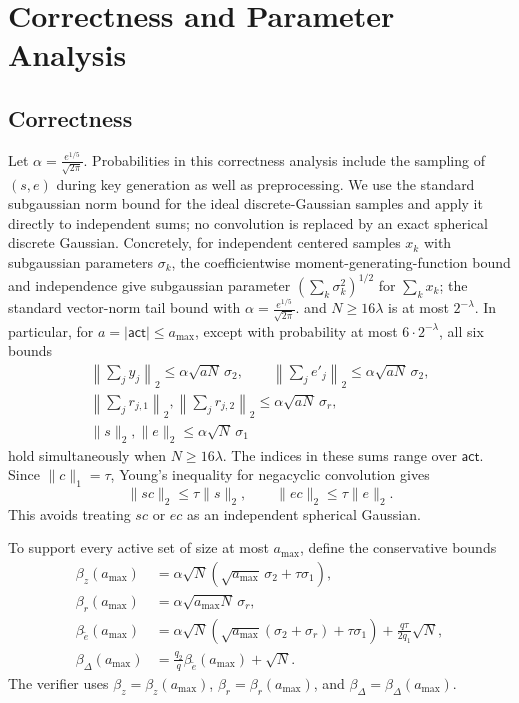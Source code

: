 \documentclass[lettersize,journal]{IEEEtran}
\begin{document}
	\section{Correctness and Parameter Analysis}
	\subsection{Correctness}
	\label{app:correctness-details}
	Let $
	\alpha=\frac{e^{1/5}}{\sqrt{2\pi}}.$
	Probabilities in this correctness analysis include the
	sampling of $(s,e)$ during key generation as well as preprocessing.
	We use the standard subgaussian norm bound for the ideal discrete-Gaussian
	samples and apply it directly to independent sums; no convolution is replaced
	by an exact spherical discrete Gaussian. {Concretely, for
		independent centered samples $x_k$ with subgaussian parameters $\sigma_k$, the
		coefficientwise moment-generating-function bound and independence give
		subgaussian parameter $(\sum_k\sigma_k^2)^{1/2}$ for $\sum_kx_k$; the standard
		vector-norm tail bound with
		$\alpha=\frac{e^{1/5}}{\sqrt{2\pi}}.$ and $N\geq16\lambda$ is at most
		$2^{-\lambda}$.} In particular, for
	$a=|\mathsf{act}|\leq a_{\max}$, except with probability at most
	$6\cdot2^{-\lambda}$, all six bounds
	\[
	\begin{gathered}
		\left\|\sum_jy_j\right\|_2
		\leq\alpha\sqrt{aN}\,\sigma_2,
		\qquad
		\left\|\sum_je'_j\right\|_2
		\leq\alpha\sqrt{aN}\,\sigma_2,\\
		\left\|\sum_jr_{j,1}\right\|_2,
		\left\|\sum_jr_{j,2}\right\|_2
		\leq\alpha\sqrt{aN}\,\sigma_r,\\
		\|s\|_2,\|e\|_2
		\leq\alpha\sqrt N\,\sigma_1
	\end{gathered}
	\]
	hold simultaneously when $N\geq16\lambda$. The indices in these sums range over
	$\mathsf{act}$. Since $\|c\|_1=\tau$, Young's inequality for negacyclic
	convolution gives
	\[
	\|sc\|_2\leq\tau\|s\|_2,
	\qquad
	\|ec\|_2\leq\tau\|e\|_2.
	\]
	This avoids treating $sc$ or $ec$ as an independent spherical Gaussian.
	
	To support every active set of size at most $a_{\max}$, define the conservative
	bounds
	\[
	\begin{aligned}
		\beta_z(a_{\max})
		&=
		\alpha\sqrt N
		\left(\sqrt{a_{\max}}\,\sigma_2+\tau\sigma_1\right),\\
		\beta_r(a_{\max})
		&=
		\alpha\sqrt{a_{\max}N}\,\sigma_r,\\
		\beta_{\widetilde e}(a_{\max})
		&=
		\alpha\sqrt N
		\left(
		\sqrt{a_{\max}}(\sigma_2+\sigma_r)
		+\tau\sigma_1
		\right)
		+\frac{q\tau}{2q_1}\sqrt N,\\
		\beta_\Delta(a_{\max})
		&=
		\frac{q_2}{q}\beta_{\widetilde e}(a_{\max})+\sqrt N.
	\end{aligned}
	\]
	The verifier uses
	$\beta_z=\beta_z(a_{\max})$,
	$\beta_r=\beta_r(a_{\max})$, and
	$\beta_\Delta=\beta_\Delta(a_{\max})$.
	
\end{document}
